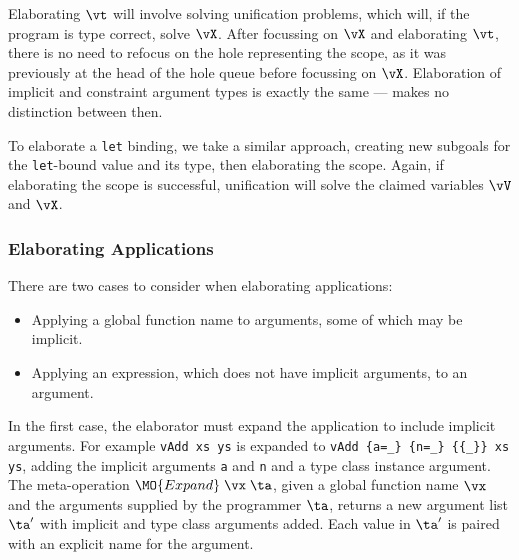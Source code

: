 
Elaborating $\vt$ will involve solving unification problems, which will, if the
program is type correct, solve $\vX$. After focussing on $\vX$ and elaborating
$\vt$, there is no need to refocus on the hole representing the scope, as it was
previously at the head of the hole queue before focussing on $\vX$.
Elaboration of implicit and constraint
argument types is exactly the same --- \TT{} makes no distinction between then.

To elaborate a \texttt{let} binding, we take a similar approach, creating new subgoals
for the \texttt{let}-bound value and its type, then elaborating the scope. Again,
if elaborating the scope is successful, unification will solve the claimed variables
$\vV$ and $\vX$.

\subsubsection{Elaborating Applications}

\label{sect:elabapps}

There are two cases to consider when elaborating applications:

\begin{itemize}
\item Applying a global function name to arguments, some of which may be implicit.
\item Applying an expression, which does not have implicit arguments, to an argument.
\end{itemize}

In the first case, the elaborator must expand the application to include implicit arguments.
For example \texttt{vAdd xs ys} is expanded to
\texttt{vAdd \{a=\_\} \{n=\_\} \{\{\_\}\} xs ys}, adding the implicit arguments
\texttt{a} and \texttt{n} and a type class instance argument. The meta-operation
$\MO{Expand}\;\vx\;\ta$, given a global function name $\vx$ and the
arguments supplied by the programmer $\ta$, returns a new argument list
$\ta'$ with implicit and type class arguments added. Each value in
$\ta'$ is paired with an explicit name for the argument.

